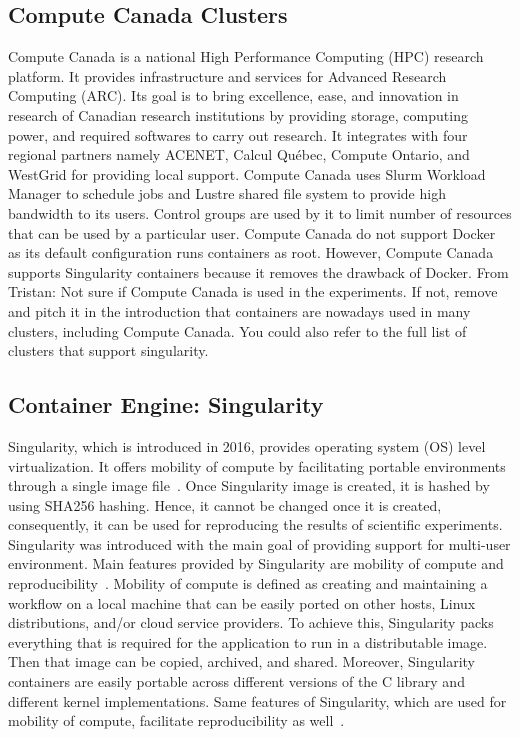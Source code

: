 \documentclass[a4paper,num-refs]{oup-contemporary}
\newcommand{\TG}[1]{\color{blue}From Tristan: #1 \color{black}}
\begin{document}
\subsection{Compute Canada Clusters}

Compute Canada is a national High Performance Computing (HPC) research platform.
It provides infrastructure and services for Advanced Research Computing (ARC).
Its goal is to bring excellence, ease, and innovation in research of Canadian
research institutions by providing storage, computing power, and required
softwares to carry out research.
It integrates with four regional partners namely ACENET, Calcul Québec, Compute
Ontario, and WestGrid for providing local support.
Compute Canada uses Slurm Workload Manager to schedule jobs and Lustre shared
file system to provide high bandwidth to its users.
Control groups are used by it to limit number of resources that can be used
by a particular user.
Compute Canada do not support Docker as its default configuration
runs containers as root. However, Compute Canada supports Singularity
containers because it removes the drawback of Docker.
\TG{Not sure if Compute Canada is used in the experiments. If not, remove and 
pitch it in the introduction that containers are nowadays used in many clusters, including 
Compute Canada. You could also refer to the full list of clusters that support singularity.}

\subsection{Container Engine: Singularity}

Singularity, which is introduced in 2016, provides operating system (OS) level
virtualization.
It offers mobility of compute by facilitating portable environments 
through a single image file~\cite{kurtzer2016singularity}. Once Singularity image
is created, it is hashed by using SHA256 hashing. Hence, it cannot be changed
once it is created, consequently, it can be used for reproducing the results of
scientific experiments. Singularity was introduced with the main goal of
providing support for multi-user environment. Main features provided by
Singularity are mobility of compute and reproducibility~\cite{kurtzer2017singularity}.
Mobility of compute is defined as creating and maintaining a workflow on
a local machine that can be easily ported on other hosts, Linux distributions,
and/or cloud service providers. To achieve this, Singularity packs everything
that is required for the application to run in a distributable image. Then that
image can be copied, archived, and shared. Moreover, Singularity containers
are easily portable across different versions of the C library and different kernel
implementations.
Same features of Singularity, which are used for mobility of compute,
facilitate reproducibility as well~\cite{sochat2017enhancing}.
\end{document}

